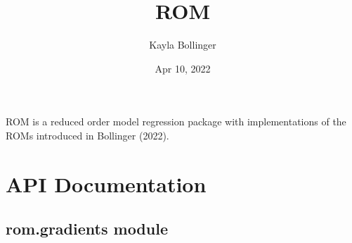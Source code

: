 \documentclass[letterpaper,10pt,english]{sphinxmanual}
\title{ROM}
\date{Apr 10, 2022}
\author{Kayla Bollinger}
\begin{document}
\pagestyle{empty}
\sphinxmaketitle
\pagestyle{plain}
\sphinxtableofcontents
\pagestyle{normal}
\label{\detokenize{index::doc}}


\sphinxAtStartPar
ROM is a reduced order model regression package with implementations of the ROMs introduced in Bollinger (2022).


\chapter{API Documentation}
\label{\detokenize{rom:api-documentation}}\label{\detokenize{rom::doc}}

\section{rom.gradients module}
\label{\detokenize{rom:module-rom.gradients}}\label{\detokenize{rom:rom-gradients-module}}
\end{document}

